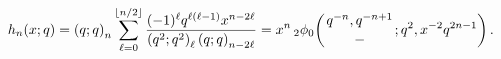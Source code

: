 \[\mathop{h_{n}\/}\nolimits\!\left(x;q\right)=\left(q;q\right)_{n}\sum_{\ell=0}^%
{\left\lfloor n/2\right\rfloor}\frac{(-1)^{\ell}q^{\ell(\ell-1)}x^{n-2\ell}}{%
\left(q^{2};q^{2}\right)_{\ell}\left(q;q\right)_{n-2\ell}}=x^{n}\mathop{{{}_{2%
}\phi_{0}}\/}\nolimits\!\left({q^{-n},q^{-n+1}\atop-};q^{2},x^{-2}q^{2n-1}%
\right).\]